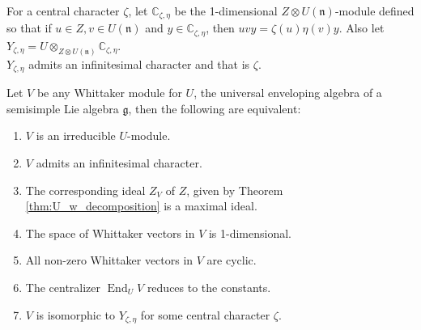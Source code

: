 \documentclass{article}
\DeclareMathOperator{\End}{End}
\theoremstyle{mytheoremstyle}
\theoremstyle{mytheoremstyle}
\theoremstyle{myproblemstyle}
\begin{document}
    For a central character $\zeta$, let $\mathbb{C}_{\zeta,\eta}$ be the 1-dimensional $Z\otimes U(\mathfrak n)$-module 
    defined so that if $u\in Z, v \in U(\mathfrak n)$ and $y \in \mathbb{C}_{\zeta,\eta}$, then $uvy = \zeta(u)\eta(v)y$.
    Also let $Y_{\zeta,\eta} = U \otimes_{Z \otimes U(\mathfrak n)} \mathbb{C}_{\zeta,\eta}$.\\

    $Y_{\zeta,\eta}$ admits an infinitesimal character and that is $\zeta$.


    \begin{theorem}
      Let $V$ be any Whittaker module for $U$, the universal enveloping algebra of a semisimple Lie algebra $\mathfrak{g}$, 
      then the following are equivalent:
      \begin{enumerate}
      	\item $V$ is an irreducible $U$-module.
	\item $V$ admits an infinitesimal character.
	\item The corresponding ideal $Z_V$ of $Z$, given by Theorem \ref{thm:U_w_decomposition} is a maximal ideal.
	\item The space of Whittaker vectors in $V$ is 1-dimensional.
	\item All non-zero Whittaker vectors in $V$ are cyclic.
	\item The centralizer $\End_U V$ reduces to the constants.
	\item $V$ is isomorphic to $Y_{\zeta,\eta}$ for some central character $\zeta$.
      \end{enumerate}
    \end{theorem}
\end{document}
